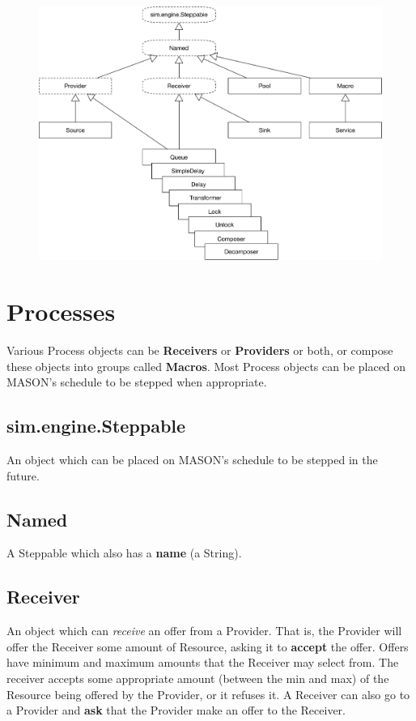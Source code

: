 \documentclass[twoside,10pt]{book}
\begin{document}
\clearpage
\begin{figure}[t]
\centering\includegraphics[width=5in]{Processes.pdf}
\end{figure}

\section{Processes}

Various Process objects can be {\bf Receivers} or {\bf Providers} or both, or compose these objects into groups called {\bf Macros}.  Most Process objects can be placed on MASON's schedule to be stepped when appropriate.

\subsection{sim.engine.Steppable}

An object which can be placed on MASON's schedule to be stepped in the future.

\subsection{Named}

A Steppable which also has a {\bf name} (a String).

\subsection{Receiver}

An object which can {\it receive} an offer from a Provider.  That is, the Provider will offer the Receiver some amount of Resource, asking it to {\bf accept} the offer.  Offers have minimum and maximum amounts that the Receiver may select from.  The receiver accepts some appropriate amount (between the min and max) of the Resource being offered by the Provider, or it refuses it.  A Receiver can also go to a Provider and {\bf ask} that the Provider make an offer to the Receiver.
\end{document}
